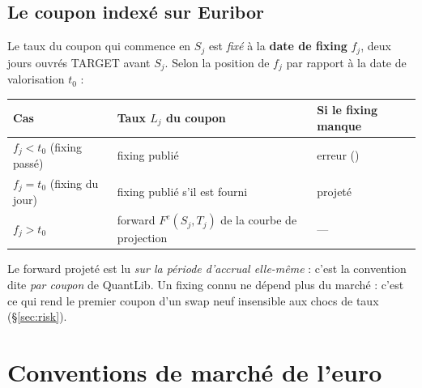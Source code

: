 \documentclass[11pt,a4paper]{article}
\newcommand{\code}[1]{\texttt{\detokenize{#1}}}
\theoremstyle{plain}
\theoremstyle{definition}
\theoremstyle{remark}
\begin{document}
\subsection{Le coupon indexé sur Euribor}\label{sec:iborcoupon}
Le taux du coupon qui commence en \(S_j\) est \emph{fixé} à la \textbf{date de fixing}
\(f_j\), deux jours ouvrés TARGET avant \(S_j\). Selon la position de \(f_j\) par rapport à la date de
valorisation \(t_0\) :
\begin{center}
\begin{tabular}{@{}lll@{}}
\toprule
Cas & Taux \(L_j\) du coupon & Si le fixing manque \\
\midrule
\(f_j < t_0\) (fixing passé) & fixing publié & erreur (\code{MarketDataError}) \\
\(f_j = t_0\) (fixing du jour) & fixing publié s'il est fourni & projeté \\
\(f_j > t_0\) & forward \(F^e(S_j,T_j)\) de la courbe de projection & --- \\
\bottomrule
\end{tabular}
\end{center}
Le forward projeté est lu \emph{sur la période d'accrual elle-même} : c'est la convention dite
\emph{par coupon} de QuantLib. Un fixing connu ne dépend plus du marché : c'est ce qui rend le premier
coupon d'un swap neuf insensible aux chocs de taux (\S\ref{sec:risk}).

\section{Conventions de marché de l'euro}\label{sec:conv}
\end{document}
